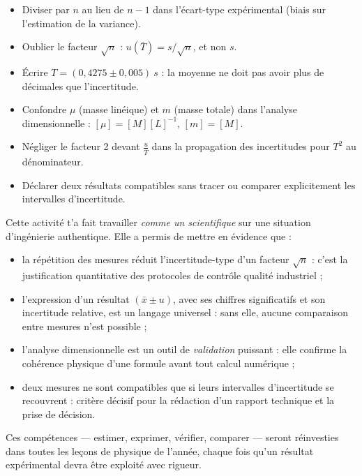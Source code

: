 \documentclass[11pt]{article}
\newcommand{\cle}[1]{{\popxbold\color{popdark}#1}}
\newcounter{popsec}
\newcounter{popsub}
\newcommand{\courssub}[1]{%
  \stepcounter{popsub}%
  \par\vspace{9pt}\noindent{\popxbold\fontsize{11.5}{13}\selectfont\color{popink}{\color{poporange}\thepopsec.\thepopsub}\hspace{6pt}#1}\par\nopagebreak\vspace{4pt}
}
\begin{document}
\begin{attention}
\begin{itemize}
\item Diviser par $n$ au lieu de $n-1$ dans l'écart-type expérimental (biais sur l'estimation de la variance).
\item Oublier le facteur $\sqrt{n}$ : $u(\bar{T}) = s/\sqrt{n}$, et non $s$.
\item Écrire $T = (0{,}4275 \pm 0{,}005)\ \si{s}$ : la moyenne ne doit pas avoir plus de décimales que l'incertitude.
\item Confondre $\mu$ (masse linéique) et $m$ (masse totale) dans l'analyse dimensionnelle : $[\mu] = [M][L]^{-1}$, $[m] = [M]$.
\item Négliger le facteur 2 devant $\frac{u}{\bar{T}}$ dans la propagation des incertitudes pour $T^2$ au dénominateur.
\item Déclarer deux résultats compatibles sans tracer ou comparer explicitement les intervalles d'incertitude.
\end{itemize}
\end{attention}

\courssub{Bilan de l'activité}

Cette activité t'a fait travailler \emph{comme un scientifique} sur une situation d'ingénierie authentique. Elle a permis de mettre en évidence que :

\begin{itemize}
\item la \cle{répétition des mesures} réduit l'incertitude-type d'un facteur $\sqrt{n}$ : c'est la justification quantitative des protocoles de contrôle qualité industriel ;
\item l'\cle{expression d'un résultat} $(\bar{x} \pm u)$, avec ses chiffres significatifs et son incertitude relative, est un langage universel : sans elle, aucune comparaison entre mesures n'est possible ;
\item l'\cle{analyse dimensionnelle} est un outil de \emph{validation} puissant : elle confirme la cohérence physique d'une formule avant tout calcul numérique ;
\item deux mesures ne sont \cle{compatibles} que si leurs intervalles d'incertitude se recouvrent : critère décisif pour la rédaction d'un rapport technique et la prise de décision.
\end{itemize}

Ces compétences — estimer, exprimer, vérifier, comparer — seront réinvesties dans toutes les leçons de physique de l'année, chaque fois qu'un résultat expérimental devra être exploité avec rigueur.
\end{document}
